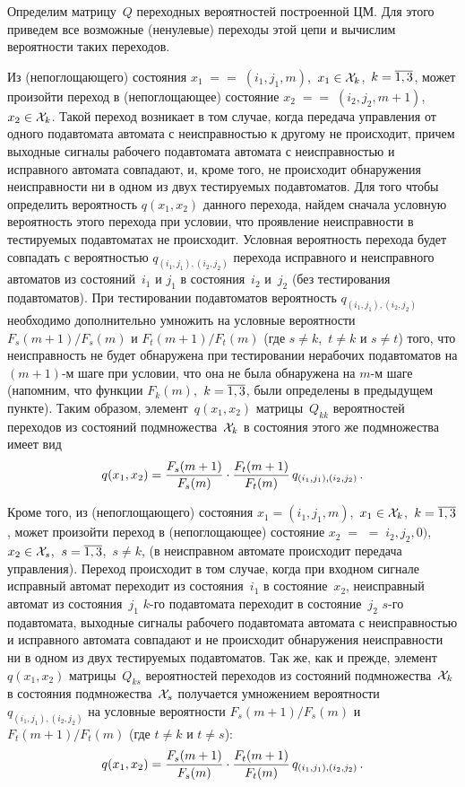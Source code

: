 \begin{multicols}{2}
 Определим матрицу~$Q$ переходных вероятностей построенной ЦМ.
Для этого приведем все возможные (ненулевые) переходы этой цепи и
вычислим вероятности таких переходов.

Из (непоглощающего) состояния
$x_1\;=$\linebreak $=\;(i_1,j_1,m)$,\ $x_1\in{\cal X}_k$,\ $k=\overline{1,3}$, может произойти
переход в (непоглощающее) состояние $x_2\;=$\linebreak $=\;(i_2,j_2,m+1)$,\ $x_2\in{\cal X}_k$.
Такой переход возникает в том случае, когда передача управления от одного
подавтомата автомата с неисправностью к другому не происходит, причем
выходные сигналы рабочего подавтомата автомата с неисправностью
и исправного автомата совпадают, и, кроме того, не происходит обнаружения
неисправности ни в одном из двух тестируемых подавтоматов.
Для того чтобы определить вероятность $q(x_1,x_2)$ данного перехода, найдем
сначала условную вероятность этого перехода при условии, что проявление
неисправности в тестируемых подавтоматах не происходит.
Условная ве\-ро\-ят\-ность перехода будет совпадать с ве\-ро\-ят\-ностью
$q_{(i_1,j_1),(i_2,j_2)}$ перехода\linebreak
 исправного и неисправного автоматов из
со\-сто\-яний~$i_1$ и $j_1$ в со\-сто\-яния~$i_2$ и~$j_2$ (без тестирования
подавтоматов).
При тес\-ти\-ро\-ва\-нии под\-ав\-то\-ма\-тов вероятность $q_{(i_1,j_1),(i_2,j_2)}$
необходимо\linebreak
 дополнительно умножить на условные ве\-ро\-ят\-ности
$F_s(m+1)/F_s(m)$ и $F_t(m+1)/F_t(m)$ (где $s\ne k$,\ $t\ne k$ и $s\ne t$)
того, что неисправность не будет обнаружена при тестировании нерабочих
под\-ав\-то\-ма\-тов на $(m+1)$-м шаге при условии, что она не была обнаружена на
$m$-м шаге (напомним, что функции $F_k(m)$,\ $k=\overline{1,3}$, были определены
в предыду\-щем пункте).
Таким образом, элемент~$q(x_1,x_2)$ мат\-ри\-цы~$Q_{kk}$ вероятностей переходов
из состояний подмножества~${\cal X}_k$ в состояния этого же подмножества
имеет вид
$$
q(x_1,x_2)
=
\displaystyle\frac{\displaystyle F_s(m+1)\mathstrut}{\displaystyle F_s(m)\mathstrut} \cdot \displaystyle\frac{\displaystyle F_t(m+1)\mathstrut}{\displaystyle F_t(m)\mathstrut}\,
q_{(i_1,j_1),(i_2,j_2)}\,.
$$

 Кроме того, из (непоглощающего) состояния
$x_1=(i_1,j_1,m)$,\ $x_1\in{\cal X}_k$,\ $k=\overline{1,3}$, может
про\-изойти переход в (непоглощающее) состояние
$x_2\;=$\linebreak
$=\;i_2,j_2,0)$,\ $x_2\in{\cal X}_s$,\ $s=\overline{1,3}$,\ $s\ne k$,
(в неисправном автомате происходит передача управления).
Переход происходит в том случае, когда при входном сигнале исправный автомат
переходит из состояния~$i_1$ в состояние~$x_2$, неисправный автомат из
состояния~$j_1$ $k$-го подавтомата переходит в состояние~$j_2$ $s$-го
подавтомата, выходные сигналы рабочего подавтомата автомата с
неисправностью и исправного автомата совпадают и не происходит обнаружения
неисправности ни в одном из двух тестируемых подавтоматов.
Так же, как и преж\-де, элемент $q(x_1,x_2)$ мат\-ри\-цы~$Q_{ks}$ вероятностей
переходов из состояний подмножества~${\cal X}_k$ в состояния подмножества~${\cal X}_s$
получается умножением вероятности $q_{(i_1,j_1),(i_2,j_2)}$
на условные вероятности $F_s(m+1)/F_s(m)$ и $F_t(m+1)/F_t(m)$
(где $t\ne k$ и $t\ne s$):
$$
q(x_1,x_2)
=
\displaystyle\frac{\displaystyle F_s(m+1)\mathstrut}{\displaystyle F_s(m)\mathstrut} \cdot \displaystyle\frac{\displaystyle F_t(m+1)\mathstrut}{\displaystyle  F_t(m)\mathstrut}\,
q_{(i_1,j_1),(i_2,j_2)}\,.
$$


\end{multicols}
